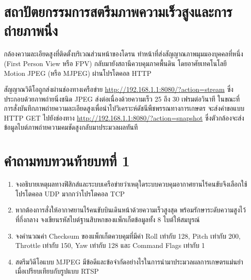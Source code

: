 \section{สถาปัตยกรรมการสตรีมภาพความเร็วสูงและการถ่ายภาพนิ่ง}

กล้องความละเอียดสูงที่ติดตั้งบริเวณส่วนหน้าของโดรน ทำหน้าที่ส่งสัญญาณภาพมุมมองบุคคลที่หนึ่ง (First Person View หรือ FPV) กลับมายังสถานีควบคุมภาคพื้นดิน โดยอาศัยเทคโนโลยี Motion JPEG (หรือ MJPEG) ผ่านโปรโตคอล HTTP

สัญญาณวิดีโอถูกส่งผ่านช่องทางเครือข่าย \url{http://192.168.1.1:8080/?action=stream} ซึ่งประกอบด้วยภาพถ่ายนิ่งชนิด JPEG ส่งต่อเนื่องด้วยความเร็ว 25 ถึง 30 เฟรมต่อวินาที ในขณะที่การสั่งบันทึกภาพถ่ายความละเอียดสูงเพื่อนำไปวิเคราะห์ดัชนีพืชพรรณทางการเกษตร จะส่งคำขอแบบ HTTP GET ไปยังช่องทาง \url{http://192.168.1.1:8080/?action=snapshot} ซึ่งตัวกล้องจะส่งข้อมูลไบต์ภาพถ่ายความคมชัดสูงกลับมาประมวลผลทันที

\clearpage

\section*{คำถามทบทวนท้ายบทที่ 1}

\begin{enumerate}
    \item จงอธิบายเหตุผลทางฟิสิกส์และระบบเครือข่ายว่าเหตุใดระบบควบคุมอากาศยานไร้คนขับจึงเลือกใช้โปรโตคอล UDP มากกว่าโปรโตคอล TCP
    \item หากต้องการสั่งให้อากาศยานไร้คนขับบินเดินหน้าด้วยความเร็วสูงสุด พร้อมรักษาระดับความสูงไว้ที่กึ่งกลาง จงเขียนรหัสไบต์ฐานสิบหกของแพ็กเก็ตข้อมูลทั้ง 8 ไบต์ให้สมบูรณ์
    \item จงคำนวณค่า Checksum ของแพ็กเก็ตควบคุมที่มีค่า Roll เท่ากับ 128, Pitch เท่ากับ 200, Throttle เท่ากับ 150, Yaw เท่ากับ 128 และ Command Flags เท่ากับ 1
    \item สตรีมวิดีโอแบบ MJPEG มีข้อดีและข้อจำกัดอย่างไรในการนำมาประมวลผลการเกษตรแม่นยำเมื่อเปรียบเทียบกับรูปแบบ RTSP
\end{enumerate}

\clearpage
